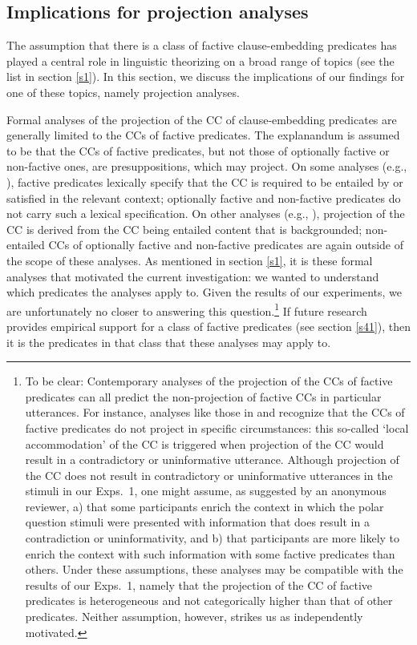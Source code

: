 \documentclass[11pt,fleqn]{article}
\newcommand{\6}{\mbox{$[\hspace*{-.6mm}[$}}
\newcommand{\9}{\mbox{$]\hspace*{-.6mm}]$}}
\begin{document}
\subsection{Implications for projection analyses}\label{s43}

The assumption that there is a class of factive clause-embedding predicates has played a central role in linguistic theorizing on a broad range of topics (see the list in section \ref{s1}). In this section, we discuss the implications of our findings for one of these topics, namely projection analyses.

Formal analyses of the projection of the CC of clause-embedding predicates are generally limited to the CCs of factive predicates. The explanandum is assumed to be that the CCs of factive predicates, but not those of optionally factive or non-factive ones, are presuppositions, which may project. On some analyses (e.g., \citealt{heim83,vds92}), factive predicates lexically specify that the CC is required to be entailed by or satisfied in the relevant context; optionally factive and non-factive predicates do not carry such a lexical specification. On other analyses (e.g., \citealt{abrusan2011,abrusan2016,romoli2015,best-question}), projection of the CC is derived from the CC being entailed content that is backgrounded; non-entailed CCs of optionally factive and non-factive predicates are again outside of the scope of these analyses. As mentioned in section \ref{s1}, it is these formal analyses that motivated the current investigation: we wanted to understand which predicates the analyses apply to.  Given the results of our experiments, we are unfortunately no closer to answering this question.\footnote{To be clear: Contemporary analyses of the projection of the CCs of factive predicates can all predict the non-projection of factive CCs in particular utterances. For instance, analyses like those in \citealt{heim83} and \citealt{vds92} recognize that the CCs of factive predicates do not project in specific circumstances: this so-called `local accommodation' of the CC is triggered when projection of the CC would result in a contradictory or uninformative utterance. Although projection of the CC does not result in contradictory or uninformative utterances in the stimuli in our Exps.~1, one might assume, as suggested by an anonymous reviewer, a) that some participants enrich the context in which the polar question stimuli were presented with information that does result in a contradiction or uninformativity, and b) that participants are more likely to enrich the context with such information with some factive predicates than others. Under these assumptions, these analyses may be compatible with the results of our Exps.~1, namely that the projection of the CC of factive predicates is heterogeneous and not categorically higher than that of other predicates. Neither assumption, however, strikes us as independently motivated.} If future research provides empirical support for a class of factive predicates (see section \ref{s41}), then it is the predicates in that class that these analyses may apply to.  
\end{document}
